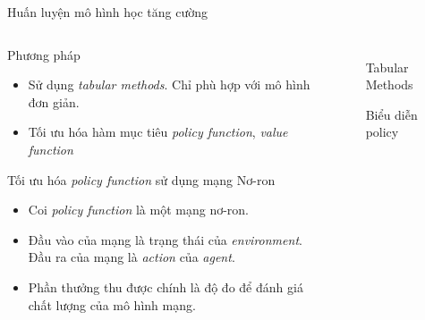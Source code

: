 	\begin{frame}{Huấn luyện mô hình học tăng cường}
		\begin{columns}
        \begin{itemize}
    		\begin{block}{Phương pháp}
    		    \begin{itemize}
    		    \setlength\itemsep{0.01em}
    		    \item Sử dụng \emph{tabular methods}. Chỉ phù hợp với mô hình đơn giản.
    		    \item Tối ưu hóa hàm mục tiêu \emph{policy function}, \emph{value function}
    		    \end{itemize}
    		\end{block}
    		\begin{block}{Tối ưu hóa \emph{policy function} sử dụng mạng Nơ-ron}
    		    \begin{itemize}
    		    \setlength\itemsep{0.01em}
    		    \item Coi \emph{policy function} là một mạng nơ-ron.
    		    \item Đầu vào của mạng là trạng thái của \emph{environment}. Đầu ra của mạng là \emph{action} của \emph{agent}.
    		    \item Phần thưởng thu được chính là độ đo để đánh giá chất lượng của mô hình mạng.
    		    \end{itemize}
    		\end{block}
		\end{itemize}
		\begin{figure}[ht]
            \centering
            \caption{Tabular Methods}
            \label{fig:problem:tabular}
            \caption{Biểu diễn policy}
        \end{figure}
		\end{columns}
	\end{frame}
	
